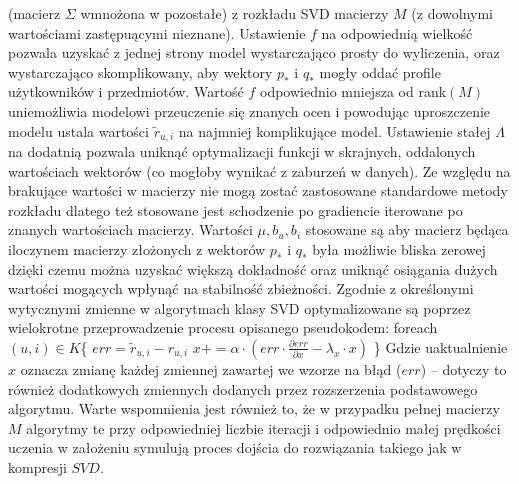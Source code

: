 \documentclass{pracamgr}
\begin{document}
     (macierz $\Sigma$ wmnożona w pozostałe) z rozkładu SVD macierzy $M$ (z dowolnymi wartościami zastępuącymi nieznane).
     Ustawienie $f$ na odpowiednią wielkość pozwala uzyskać z jednej strony model wystarczająco prosty do wyliczenia,
     oraz wystarczająco skomplikowany, aby wektory $p_*$ i $q_*$ mogły oddać profile użytkowników i przedmiotów.
     Wartość $f$ odpowiednio mniejsza od rank$(M)$ uniemożliwia modelowi przeuczenie się znanych ocen i powodując uproszczenie modelu
     ustala wartości $\tilde{r}_{u,i}$ na najmniej komplikujące model.
     Ustawienie stałej $\Lambda$ na dodatnią pozwala uniknąć optymalizacji funkcji w skrajnych, oddalonych wartościach wektorów
     (co mogłoby wynikać z zaburzeń w danych).\newline
     Ze względu na brakujące wartości w macierzy nie mogą zostać zastosowane standardowe metody rozkładu dlatego też stosowane jest
     schodzenie po gradiencie iterowane po znanych wartościach macierzy.
     Wartości $\mu,b_u,b_i$ stosowane są aby macierz będąca iloczynem macierzy złożonych z wektorów $p_*$ i $q_*$ była możliwie bliska zerowej
     dzięki czemu można uzyskać większą dokładność oraz uniknąć osiągania dużych wartości mogących wpłynąć na stabilność zbieżności.\newline
     Zgodnie z określonymi wytycznymi zmienne w algorytmach klasy SVD optymalizowane są
     poprzez wielokrotne przeprowadzenie procesu opisanego pseudokodem:\newline\newline
     \hspace*{16pt}	foreach $(u,i)\in K$\{\newline
     \hspace*{32pt}		$err=\tilde{r}_{u,i}-r_{u,i}$\newline
     \hspace*{32pt}		$x+=\alpha\cdot(err\cdot\frac{\partial err}{\partial x}-\lambda_{x}\cdot x)$\newline
     \hspace*{16pt}	\}\newline    
     Gdzie uaktualnienie $x$ oznacza zmianę każdej zmiennej zawartej we wzorze na błąd ($err$) -- dotyczy to również dodatkowych zmiennych dodanych
     przez rozszerzenia podstawowego algorytmu.\newline
     Warte wspomnienia jest również to, że w przypadku pełnej macierzy $M$ algorytmy te przy odpowiedniej liczbie iteracji i odpowiednio małej
     prędkości uczenia w założeniu symulują proces dojścia do rozwiązania takiego jak w kompresji $SVD$.
\end{document}
